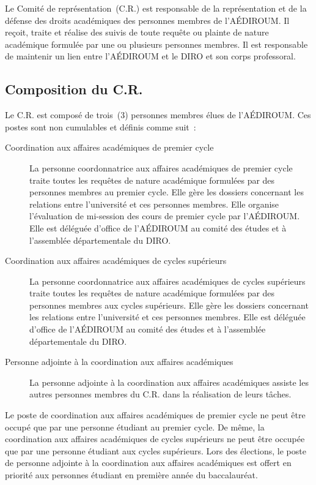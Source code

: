 \documentclass{aediroum}
\begin{document}
Le Comité de représentation~(C.R.) est responsable de la représentation et de la défense des droits académiques des personnes membres de l’AÉDIROUM.
Il reçoit, traite et réalise des suivis de toute requête ou plainte de nature académique formulée par une ou plusieurs personnes membres.
Il est responsable de maintenir un lien entre l’AÉDIROUM et le DIRO et son corps professoral.

\subsection{Composition du C.R.}\label{sec:composition-du-conseil-dadministration}

Le C.R. est composé de trois~(3) personnes membres élues de l’AÉDIROUM.
Ces postes sont non cumulables et définis comme suit~:

\begin{description}
    \item[Coordination aux affaires académiques de premier cycle]
        La personne coordonnatrice aux affaires académiques de premier cycle traite toutes les requêtes de nature académique formulées par des personnes membres au premier cycle.
        Elle gère les dossiers concernant les relations entre l’université et ces personnes membres.
        Elle organise l’évaluation de mi-session des cours de premier cycle par l’AÉDIROUM.
        Elle est déléguée d’office de l’AÉDIROUM au comité des études et à l’assemblée départementale du DIRO.

    \item[Coordination aux affaires académiques de cycles supérieurs]
        La personne coordonnatrice aux affaires académiques de cycles supérieurs traite toutes les requêtes de nature académique formulées par des personnes membres aux cycles supérieurs.
        Elle gère les dossiers concernant les relations entre l’université et ces personnes membres.
        Elle est déléguée d’office de l’AÉDIROUM au comité des études et à l’assemblée départementale du DIRO.

    \item[Personne adjointe à la coordination aux affaires académiques]
        La personne adjointe à la coordination aux affaires académiques assiste les autres personnes membres du C.R. dans la réalisation de leurs tâches.
\end{description}

Le poste de coordination aux affaires académiques de premier cycle ne peut être occupé que par une personne étudiant au premier cycle.
De même, la coordination aux affaires académiques de cycles supérieurs ne peut être occupée que par une personne étudiant aux cycles supérieurs.
Lors des élections, le poste de personne adjointe à la coordination aux affaires académiques est offert en priorité aux personnes étudiant en première année du baccalauréat.
\end{document}
